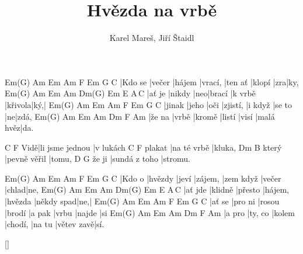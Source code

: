 \documentclass{song}
\title{Hvězda na vrbě}
\author{Karel Mareš, Jiří Štaidl}
\begin{document}
\strophe
Em(G)   Am     Em     Am      F       Em     G   C
|Kdo se |večer |hájem |vrací, |ten ať |klopí |zra|ky,
Em(G)  Am     Em  Am     Dm(G\7) Em		 E   A\,C
|ať je |nikdy |neo|brací |k vrbě |křivola|ký,|
Em(G)  Am    Em   Am       F       Em     G  C
|jinak |jeho |oči |zjistí, |i když |se to |ne|zdá,
Em(G)  Am    Em     Am     Dm    F         Am
|že na |vrbě |kromě |listí |visí |malá hvěz|da.
\endstrophe

    C               F
Vidě|li jsme jednou |v lukách
       C           F
plakat |na té vrbě |kluka,
      Dm           B
který |pevně věřil |tomu,
      D\7           G
že ji |sundá z toho |stromu.
\endstrophe

\strophe
Em(G)  Am      Em    Am      F         Em     G     C
|Kdo o |hvězdy |jeví |zájem, |zem když |večer |chlad|ne,
Em(G)   Am      Em      Am      Dm(G\7) Em         E   A\,C
|ať jde |klidně |přesto |hájem, |hvězda |někdy spad|ne,|
Em(G)  Am      Em     Am     F      Em    G      C
|ať se |pro ni |rosou |brodí |a pak |vrbu |najde |si
Em(G)  Am      Em     Am      Dm     F          Am
|a pro |ty, co |kolem |chodí, |na tu |větev zavě|sí.
\endstrophe

\ref{}
\end{document}

